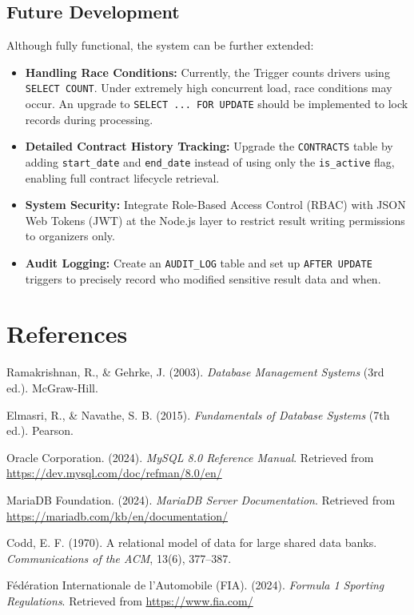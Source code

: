 \documentclass[12pt, a4paper]{report}
\begin{document}
\section{Future Development}
Although fully functional, the system can be further extended:
\begin{itemize}
    \item \textbf{Handling Race Conditions:} Currently, the Trigger counts drivers using \texttt{SELECT COUNT}. Under extremely high concurrent load, race conditions may occur. An upgrade to \texttt{SELECT ... FOR UPDATE} should be implemented to lock records during processing.
    \item \textbf{Detailed Contract History Tracking:} Upgrade the \texttt{CONTRACTS} table by adding \texttt{start\_date} and \texttt{end\_date} instead of using only the \texttt{is\_active} flag, enabling full contract lifecycle retrieval.
    \item \textbf{System Security:} Integrate Role-Based Access Control (RBAC) with JSON Web Tokens (JWT) at the Node.js layer to restrict result writing permissions to organizers only.
    \item \textbf{Audit Logging:} Create an \texttt{AUDIT\_LOG} table and set up \texttt{AFTER UPDATE} triggers to precisely record who modified sensitive result data and when.
\end{itemize}

\chapter*{References}

\begin{enumerate}[label={[\arabic*]}]
    \item Ramakrishnan, R., \& Gehrke, J. (2003). \textit{Database Management Systems} (3rd ed.). McGraw-Hill.
    \item Elmasri, R., \& Navathe, S. B. (2015). \textit{Fundamentals of Database Systems} (7th ed.). Pearson.
    \item Oracle Corporation. (2024). \textit{MySQL 8.0 Reference Manual}. Retrieved from \url{https://dev.mysql.com/doc/refman/8.0/en/}
    \item MariaDB Foundation. (2024). \textit{MariaDB Server Documentation}. Retrieved from \url{https://mariadb.com/kb/en/documentation/}
    \item Codd, E. F. (1970). A relational model of data for large shared data banks. \textit{Communications of the ACM}, 13(6), 377--387.
    \item F\'{e}d\'{e}ration Internationale de l'Automobile (FIA). (2024). \textit{Formula 1 Sporting Regulations}. Retrieved from \url{https://www.fia.com/}
\end{enumerate}
\end{document}
